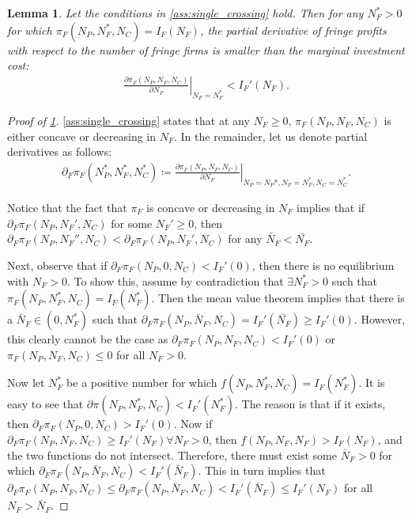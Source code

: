 \documentclass[a4paper]{article}
\newtheorem{lemma}{Lemma}
\begin{document}
\begin{lemma}
    \label{lem:slope_at_eq}
    Let the conditions in \cref{ass:single_crossing} hold. Then for any $N_F^* > 0$ for which $\pi_F(N_P, N_F^*, N_C) = I_F(N_F)$, the partial derivative of fringe profits with respect to the number of fringe firms is smaller than the marginal investment cost:
    \begin{align*}
        \left. \frac{\partial \pi_F(N_P, N_F, N_C)}{\partial N_F} \right|_{N_F = N_F^*} < I_F'(N_F).
    \end{align*}
\end{lemma}
\begin{proof}[Proof of \cref{lem:slope_at_eq}]
    \cref{ass:single_crossing} states that at any $N_F \geq 0$, $\pi_F(N_P, N_F, N_C)$ is either concave or decreasing in $N_F$.
    In the remainder, let us denote partial derivatives as follows:
    \begin{align*}
        \partial_F \pi_F(N_P^*, N_F^*, N_C^*) \coloneqq \left. \frac{\partial \pi_F(N_P, N_F, N_C)}{\partial N_F} \right|_{N_P = N_P*, N_F = N_F^*, N_C = N_C^*}.
    \end{align*}

    Notice that the fact that $\pi_F$ is concave or decreasing in $N_F$ implies that if $\partial_F \pi_F(N_P, N_F', N_C)$ for some $N_F' \geq 0$, then $\partial_F \pi_F(N_P, N_F'', N_C) < \partial_F \pi_F(N_P, N_F', N_C)$ for any $\tilde{N_F} < \bar{N_F}$.

    Next, observe that if $\partial_F \pi_F(N_P, 0, N_C) < I_F'(0)$, then there is no equilibrium with $N_F > 0$.
    To show this, assume by contradiction that $\exists N_F^* > 0$ such that $\pi_F(N_P, N_F^*, N_C) = I_F(N_F^*)$.
    Then the mean value theorem implies that there is a $\bar{N}_F \in (0, N_F^*)$ such that $\partial_F \pi_F(N_P, \bar{N}_F, N_C) = I_F'(\bar{N_F}) \geq I_F'(0)$.
    However, this clearly cannot be the case as $\partial_F \pi_F(N_P, N_F, N_C) < I_F'(0)$ or $\pi_F(N_P, N_F, N_C) \leq 0$ for all $N_F > 0$.

    Now let $N_F^*$ be a positive number for which $f(N_P, N_F^*, N_C) = I_F(N_F^*)$.
    It is easy to see that $\partial \pi(N_P, N_F^*, N_C) < I_F'(N_F^*)$.
    The reason is that if it exists, then $\partial_F \pi_F(N_P, 0, N_C) > I_F'(0)$.
    Now if $\partial_F \pi_F(N_P, N_F, N_C) \geq I_F'(N_F) \forall N_F > 0$, then $f(N_P, N_F, N_F) > I_F(N_F)$, and the two functions do not intersect.
    Therefore, there must exist some $\bar{N}_F > 0$ for which $\partial_F \pi_F(N_P, \bar{N}_F, N_C) < I_F'(\bar{N}_F)$.
    This in turn implies that $\partial_F \pi_F(N_P, N_F, N_C) \leq \partial_F \pi_F(N_P, \bar{N}_F, N_C) < I_F'(\bar{N}_F) \leq I_F'(N_F)$ for all $N_F > \bar{N}_F$.
\end{proof}
\end{document}
